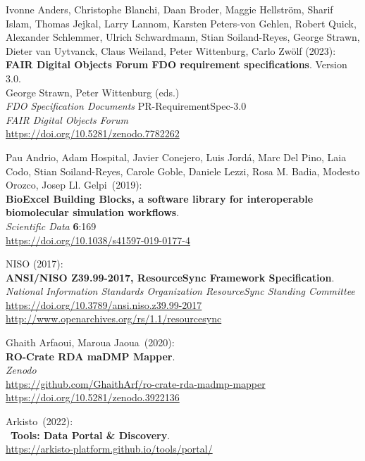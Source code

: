 \begin{thebibliography}{9}
Ivonne Anders, Christophe Blanchi, Daan Broder, Maggie Hellström, Sharif Islam, Thomas Jejkal, Larry Lannom, Karsten Peters-von Gehlen, Robert Quick, Alexander Schlemmer, Ulrich Schwardmann, Stian Soiland-Reyes, George Strawn, Dieter van Uytvanck, Claus Weiland, Peter Wittenburg, Carlo Zwölf (2023):\\
\textbf{{FAIR Digital Objects Forum FDO} requirement specifications}. Version 3.0.\\
George Strawn, Peter Wittenburg (eds.)\\
\emph{FDO Specification Documents} PR-RequirementSpec-3.0\\
\emph{FAIR Digital Objects Forum}\\
\url{https://doi.org/10.5281/zenodo.7782262}

Pau Andrio, Adam Hospital, Javier Conejero, Luis Jordá, Marc
Del Pino, Laia Codo, Stian Soiland-Reyes, Carole Goble, Daniele Lezzi,
Rosa M. Badia, Modesto Orozco, Josep Ll. Gelpi~(2019):\\
\textbf{BioExcel Building Blocks, a software library for interoperable
biomolecular simulation workflows}.\\
\emph{Scientific Data} \textbf{6}:169\\
\url{https://doi.org/10.1038/s41597-019-0177-4}

NISO (2017):\\
\textbf{ANSI/NISO Z39.99-2017, ResourceSync Framework Specification}.\\
\emph{National Information Standards Organization ResourceSync Standing Committee}\\
\url{https://doi.org/10.3789/ansi.niso.z39.99-2017}\\
\url{http://www.openarchives.org/rs/1.1/resourcesync}

Ghaith Arfaoui, Maroua Jaoua~(2020):\\
\textbf{RO-Crate RDA maDMP Mapper}.\\
\emph{Zenodo}\\
\url{https://github.com/GhaithArf/ro-crate-rda-madmp-mapper}\\
\url{https://doi.org/10.5281/zenodo.3922136}

Arkisto~(2022):\\
~\textbf{Tools: Data Portal \& Discovery}.\\
\url{https://arkisto-platform.github.io/tools/portal/}


\end{thebibliography}
